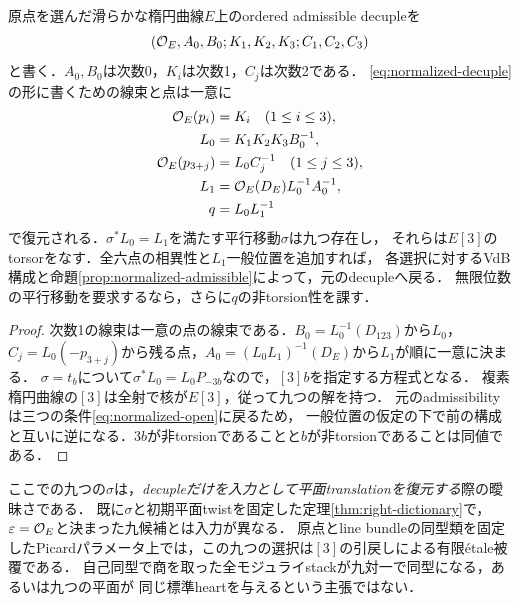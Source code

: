 \begin{proposition}[decupleからの逆辞書]\label{prop:inverse-decuple}
原点を選んだ滑らかな楕円曲線$E$上のordered admissible decupleを
\[
 (\mathcal O_E,A_0,B_0;
 K_1,K_2,K_3;
 C_1,C_2,C_3)
\]
と書く．$A_0,B_0$は次数0，$K_i$は次数1，$C_j$は次数2である．
\eqref{eq:normalized-decuple}の形に書くための線束と点は一意に
\begin{equation}\label{eq:inverse-decuple}
\begin{split}
 \mathcal O_E(p_i)&=K_i\quad(1\le i\le3),\\
 L_0&=K_1K_2K_3B_0^{-1},\\
 \mathcal O_E(p_{3+j})&=L_0C_j^{-1}\quad(1\le j\le3),\\
 L_1&=\mathcal O_E(D_E)L_0^{-1}A_0^{-1},\\
 q&=L_0L_1^{-1}
\end{split}
\end{equation}
で復元される．$\sigma^*L_0=L_1$を満たす平行移動$\sigma$は九つ存在し，
それらは$E[3]$のtorsorをなす．全六点の相異性と$L_1$一般位置を追加すれば，
各選択に対するVdB構成と命題\ref{prop:normalized-admissible}によって，元のdecupleへ戻る．
無限位数の平行移動を要求するなら，さらに$q$の非torsion性を課す．
\end{proposition}
\begin{proof}
次数1の線束は一意の点の線束である．$B_0=L_0^{-1}(D_{123})$から$L_0$，
$C_j=L_0(-p_{3+j})$から残る点，$A_0=(L_0L_1)^{-1}(D_E)$から$L_1$が順に一意に決まる．
$\sigma=t_b$について$\sigma^*L_0=L_0P_{-3b}$なので，$[3]b$を指定する方程式となる．
複素楕円曲線の$[3]$は全射で核が$E[3]$，従って九つの解を持つ．
元のadmissibilityは三つの条件\eqref{eq:normalized-open}に戻るため，
一般位置の仮定の下で前の構成と互いに逆になる．$3b$が非torsionであることと$b$が非torsionであることは同値である．
\end{proof}
\begin{remark}
ここでの九つの$\sigma$は，\emph{decupleだけを入力として平面translationを復元する}際の曖昧さである．
既に$\sigma$と初期平面twistを固定した定理\ref{thm:right-dictionary}で，
$\varepsilon=\mathcal O_E$と決まった九候補とは入力が異なる．
原点とline bundleの同型類を固定したPicardパラメータ上では，この九つの選択は$[3]$の引戻しによる有限étale被覆である．
自己同型で商を取った全モジュライstackが九対一で同型になる，あるいは九つの平面が
同じ標準heartを与えるという主張ではない．
\end{remark}

